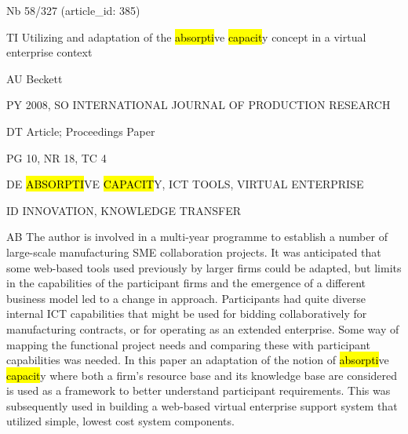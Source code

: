 \documentclass[a4paper]{article}
\begin{document}
\vspace*{-2cm}
Nb \tabto{0cm}58/327 (article\_id: 385)\par
TI \tabto{0cm}Utilizing and adaptation of the \hl{absorpti}ve \hl{capacit}y concept in a virtual enterprise context\par
AU \tabto{0cm}Beckett\par
PY \tabto{0cm}2008, SO INTERNATIONAL JOURNAL OF PRODUCTION RESEARCH\par
DT \tabto{0cm}Article; Proceedings Paper\par
PG \tabto{0cm}10, NR 18, TC 4\par
DE \tabto{0cm}\hl{ABSORPTI}VE \hl{CAPACIT}Y, ICT TOOLS, VIRTUAL ENTERPRISE\par
ID \tabto{0cm}INNOVATION, KNOWLEDGE TRANSFER\par
AB \tabto{0cm}The author is involved in a multi-year programme to establish a number of large-scale manufacturing SME collaboration projects. It was anticipated that some web-based tools used previously by larger firms could be adapted, but limits in the capabilities of the participant firms and the emergence of a different business model led to a change in approach. Participants had quite diverse internal ICT capabilities that might be used for bidding collaboratively for manufacturing contracts, or for operating as an extended enterprise. Some way of mapping the functional project needs and comparing these with participant capabilities was needed. In this paper an adaptation of the notion of \hl{absorpti}ve \hl{capacit}y where both a firm's resource base and its knowledge base are considered is used as a framework to better understand participant requirements. This was subsequently used in building a web-based virtual enterprise support system that utilized simple, lowest cost system components.\par
\clearpage
\end{document}
